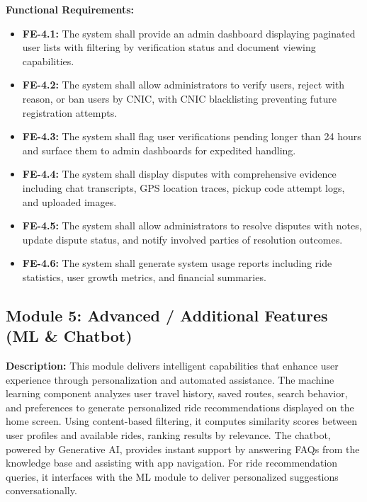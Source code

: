 \textbf{Functional Requirements:}

\begin{itemize}
    \item \textbf{FE-4.1:} The system shall provide an admin dashboard displaying paginated user lists with filtering by verification status and document viewing capabilities.
    
    \item \textbf{FE-4.2:} The system shall allow administrators to verify users, reject with reason, or ban users by CNIC, with CNIC blacklisting preventing future registration attempts.
    
    \item \textbf{FE-4.3:} The system shall flag user verifications pending longer than 24 hours and surface them to admin dashboards for expedited handling.
    
    \item \textbf{FE-4.4:} The system shall display disputes with comprehensive evidence including chat transcripts, GPS location traces, pickup code attempt logs, and uploaded images.
    
    \item \textbf{FE-4.5:} The system shall allow administrators to resolve disputes with notes, update dispute status, and notify involved parties of resolution outcomes.
    
    \item \textbf{FE-4.6:} The system shall generate system usage reports including ride statistics, user growth metrics, and financial summaries.
\end{itemize}

\subsection{Module 5: Advanced / Additional Features (ML \& Chatbot)}

\textbf{Description:} This module delivers intelligent capabilities that enhance user experience through personalization and automated assistance. The machine learning component analyzes user travel history, saved routes, search behavior, and preferences to generate personalized ride recommendations displayed on the home screen. Using content-based filtering, it computes similarity scores between user profiles and available rides, ranking results by relevance. The chatbot, powered by Generative AI, provides instant support by answering FAQs from the knowledge base and assisting with app navigation. For ride recommendation queries, it interfaces with the ML module to deliver personalized suggestions conversationally.

